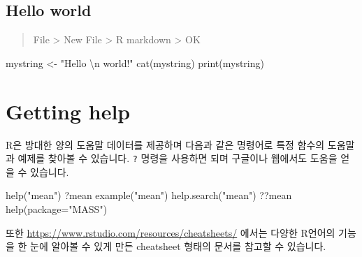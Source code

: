 \documentclass[
]{book}
\newenvironment{Shaded}{\begin{snugshade}}{\end{snugshade}}
\newcommand{\AttributeTok}[1]{\textcolor[rgb]{0.77,0.63,0.00}{#1}}
\newcommand{\FunctionTok}[1]{\textcolor[rgb]{0.00,0.00,0.00}{#1}}
\newcommand{\NormalTok}[1]{#1}
\newcommand{\OtherTok}[1]{\textcolor[rgb]{0.56,0.35,0.01}{#1}}
\newcommand{\SpecialCharTok}[1]{\textcolor[rgb]{0.00,0.00,0.00}{#1}}
\newcommand{\StringTok}[1]{\textcolor[rgb]{0.31,0.60,0.02}{#1}}
\begin{document}
\hypertarget{hello-world}{%
\subsection{Hello world}\label{hello-world}}

\begin{quote}
File \textgreater{} New File \textgreater{} R markdown \textgreater{} OK
\end{quote}

\begin{Shaded}
\begin{Highlighting}[]
\NormalTok{mystring }\OtherTok{\textless{}{-}} \StringTok{"Hello }\SpecialCharTok{\textbackslash{}n}\StringTok{ world!"}
\FunctionTok{cat}\NormalTok{(mystring)}
\FunctionTok{print}\NormalTok{(mystring)}
\end{Highlighting}
\end{Shaded}

\hypertarget{getting-help}{%
\section{Getting help}\label{getting-help}}

R은 방대한 양의 도움말 데이터를 제공하며 다음과 같은 명령어로 특정 함수의 도움말과 예제를 찾아볼 수 있습니다. \texttt{?} 명령을 사용하면 되며 구글이나 웹에서도 도움을 얻을 수 있습니다.

\begin{Shaded}
\begin{Highlighting}[]
\FunctionTok{help}\NormalTok{(}\StringTok{"mean"}\NormalTok{)}
\NormalTok{?mean}
\FunctionTok{example}\NormalTok{(}\StringTok{"mean"}\NormalTok{)}
\FunctionTok{help.search}\NormalTok{(}\StringTok{"mean"}\NormalTok{)}
\NormalTok{??mean}
\FunctionTok{help}\NormalTok{(}\AttributeTok{package=}\StringTok{"MASS"}\NormalTok{)}
\end{Highlighting}
\end{Shaded}

또한 \url{https://www.rstudio.com/resources/cheatsheets/} 에서는 다양한 R언어의 기능을 한 눈에 알아볼 수 있게 만든 cheatsheet 형태의 문서를 참고할 수 있습니다.
\end{document}
